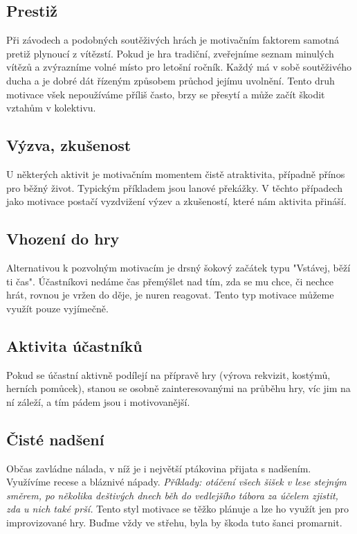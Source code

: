 \documentclass[a4paper,12pt,final]{report}
\begin{document}
\subsection*{Prestiž}
Při závodech a podobných soutěživých hrách je motivačním faktorem samotná pretiž plynoucí z vítězstí. Pokud je hra tradiční, zveřejníme seznam minulých vítězů a zvýrazníme volné místo pro letošní ročník. Každý má v sobě soutěživého ducha a je dobré dát řízeným způsobem průchod jejímu uvolnění. Tento druh motivace všek nepoužíváme příliš často, brzy se přesytí a může začít škodit vztahům v kolektivu.

\subsection*{Výzva, zkušenost}
U některých aktivit je motivačním momentem čistě atraktivita, případně přínos pro běžný život. Typickým příkladem jsou lanové překážky. V těchto případech jako motivace postačí vyzdvižení výzev a zkušeností, které nám aktivita přináší.

\subsection*{Vhození do hry}
Alternativou k pozvolným motivacím je drsný šokový začátek typu "Vstávej, běží ti čas". Účastníkovi nedáme čas přemýšlet nad tím, zda se mu chce, či nechce hrát, rovnou je vržen do děje, je nuren reagovat. Tento typ motivace můžeme využít pouze vyjímečně.

\subsection*{Aktivita účastníků}
Pokud se účastní aktivně podílejí na přípravě hry (výrova rekvizit, kostýmů, herních pomůcek), stanou se osobně zainteresovanými na průběhu hry, víc jim na ní záleží, a tím pádem jsou i motivovanější.

\subsection*{Čisté nadšení}
Občas zavládne nálada, v níž je i největší ptákovina přijata s nadšením. Využívíme recese a bláznivé nápady. 
\textit{Příklady: otáčení všech šišek v lese stejným směrem, po několika deštivých dnech běh do vedlejšího tábora za účelem zjistit, zda u nich také prší.}
Tento styl motivace se těžko plánuje a lze ho využít jen pro improvizované hry. Buďme vždy ve střehu, byla by škoda tuto šanci promarnit.
\end{document}
